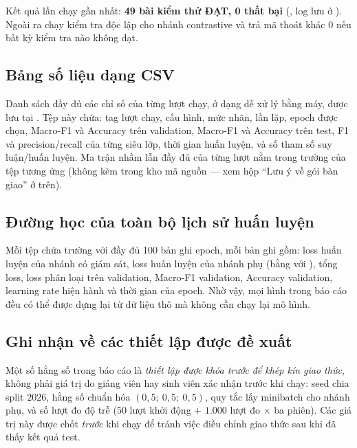 Kết quả lần chạy gần nhất: \textbf{49 bài kiểm thử ĐẠT, 0 thất bại}
(, log lưu ở ). Ngoài ra
 chạy kiểm tra độc lập cho nhánh contrastive và trả mã thoát
khác $0$ nếu bất kỳ kiểm tra nào không đạt.

\subsection{Bảng số liệu dạng CSV}
\label{sec:appendix-csv}

Danh sách đầy đủ các chỉ số của từng lượt chạy, ở dạng dễ xử lý bằng máy, được lưu tại
. Tệp này chứa: tag lượt chạy, cấu hình, mức nhãn, lần lặp, epoch
được chọn, Macro-F1 và Accuracy trên validation, Macro-F1 và Accuracy trên test, F1 và
precision/recall của từng siêu lớp, thời gian huấn luyện, và số tham số suy luận/huấn luyện.
Ma trận nhầm lẫn đầy đủ của từng lượt nằm trong trường  của tệp
 tương ứng (không kèm trong kho mã nguồn — xem hộp
\enquote{Lưu ý về gói bàn giao} ở trên).

\subsection{Đường học của toàn bộ lịch sử huấn luyện}
\label{sec:appendix-history}

Mỗi tệp  chứa trường  với đầy đủ 100 bản ghi
epoch, mỗi bản ghi gồm: loss huấn luyện của nhánh có giám sát, loss huấn luyện của nhánh phụ
(bằng  với ), tổng loss, loss phân loại trên validation, Macro-F1 validation,
Accuracy validation, learning rate hiện hành và thời gian của epoch. Nhờ vậy, mọi hình trong báo
cáo đều có thể được dựng lại từ dữ liệu thô mà không cần chạy lại mô hình.

\subsection{Ghi nhận về các thiết lập được đề xuất}
\label{sec:appendix-proposed}

Một số hằng số trong báo cáo là \emph{thiết lập được khóa trước để khép kín giao thức}, không
phải giá trị do giảng viên hay sinh viên xác nhận trước khi chạy: seed chia split $2026$, hằng
số chuẩn hóa $(0{,}5;\ 0{,}5;\ 0{,}5)$, quy tắc lấy minibatch cho nhánh phụ, và số lượt đo độ
trễ ($50$ lượt khởi động $+$ $1.000$ lượt đo $\times$ ba phiên). Các giá trị này được chốt
\emph{trước} khi chạy để tránh việc điều chỉnh giao thức sau khi đã thấy kết quả test.
